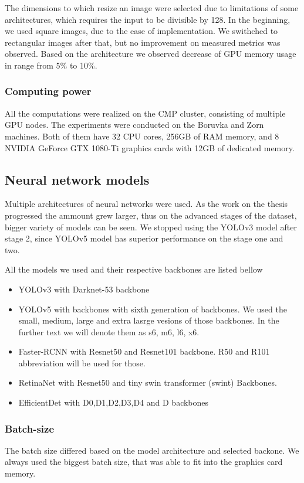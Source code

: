 The dimensions to which resize an image were selected due to limitations of some architectures, which requires the input to be divisible by 128. In the beginning, we used square images, due to the ease of implementation. We swithched to rectangular images after that, but no improvement on measured metrics was observed. Based on the architecture we observed decrease of GPU memory usage in range from 5\% to 10\%.

\subsubsection{Computing power}
All the computations were realized on the CMP cluster, consisting of multiple GPU nodes. The experiments were conducted on the Boruvka and Zorn machines. Both of them have 32 CPU cores, 256GB of RAM memory, and 8 NVIDIA GeForce GTX 1080-Ti graphics cards with 12GB of dedicated memory.

\subsection{Neural network models}
Multiple architectures of neural networks were used. As the work on the thesis progressed the ammount grew larger, thus on the advanced stages of the dataset, bigger variety of models can be seen. We stopped using the YOLOv3 model after stage 2, since YOLOv5 model has superior performance on the stage one and two.

All the models we used and their respective backbones are listed bellow
\begin{itemize}
    \item YOLOv3 with Darknet-53 backbone
    \item YOLOv5 with backbones with sixth generation of backbones. We used the small, medium, large and extra lasrge vesions of those backbones. In the further text we will denote them as s6, m6, l6, x6.
    \item Faster-RCNN with Resnet50 and Resnet101 backbone. R50 and R101 abbreviation will be used for those.
    \item RetinaNet with Resnet50 and tiny swin transformer (swint) Backbones.
    \item EfficientDet with D0,D1,D2,D3,D4 and D backbones
\end{itemize}

\subsubsection{Batch-size}
The batch size differed based on the model architecture and selected backone. We always used the biggest batch size, that was able to fit into the graphics card memory.

